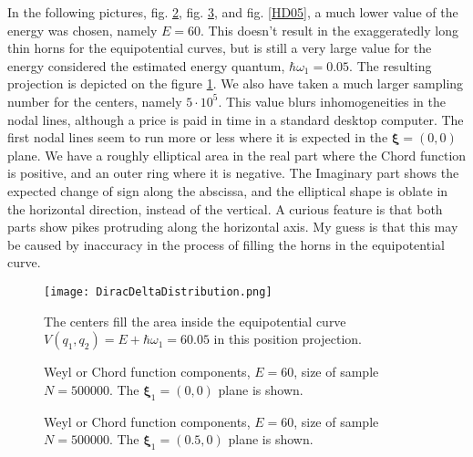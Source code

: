 \documentclass[a4paper,12pt]{article}
\newcommand{\xifase}{ {\boldsymbol{\xi}} }
\begin{document}
 
In the following pictures, fig. \ref{HD00}, fig. \ref{HD50}, 
and fig. \ref{HD05}, a 
much lower value of the energy was chosen, namely $E=60$. 
This doesn't result in the exaggeratedly long thin horns
for the equipotential curves, 
but is still a very
large value for the energy considered the estimated
energy quantum, $\hbar\omega_1=0.05$.
The resulting projection is depicted on the
figure \ref{Equipot}. We also have taken a much larger
sampling number for the centers, namely $5\cdot 10^5$.
This value blurs inhomogeneities in the nodal lines,
although a price is paid in time in a standard 
desktop computer.
The first nodal lines seem to run more or less where it is expected
in the $\xifase=(0,0)$ plane. We have a roughly elliptical
area in the real part where the Chord function is positive, and
an outer ring where it is negative.  The Imaginary part shows
the expected change of sign along the abscissa, and the
elliptical shape is oblate in the horizontal direction, instead
of the vertical. A curious feature is that both parts
show pikes protruding along the horizontal axis. My guess is that
this may be caused by inaccuracy in the process of  filling the horns in
the equipotential curve.  


\begin{figure}
\begin{center}
\texttt{[image: DiracDeltaDistribution.png]}
\caption{The centers fill the area inside the equipotential
curve $V(q_1, q_2)=E+\hbar\omega_1=60.05$ in this
position projection. }\label{Equipot}
\end{center}
\end{figure}

\begin{figure}
\begin{center}
\caption{Weyl or Chord function components, $E=60$, size of
sample $N=500000$. The $\xifase_1=(0,0)$ plane is shown.}
\label{HD00}
\end{center}
\end{figure}



\begin{figure}
\begin{center}
\caption{Weyl or Chord function components, $E=60$, size of
sample $N=500000$. The $\xifase_1=(0.5,0)$ plane is shown.}
\label{HD50}
\end{center}
\end{figure}
\end{document}
